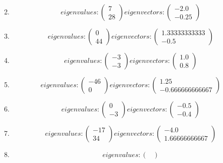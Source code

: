\documentclass{article}%
\begin{document}
\begin{enumerate}[label=\arabic*)]
\[\]%
\item%
\[%
eigenvalues: \begin{pmatrix}%
7\\%
28%
\end{pmatrix} eigenvectors: \begin{pmatrix}%
-2.0\\%
-0.25%
\end{pmatrix}%
\]%
\item%
\[%
eigenvalues: \begin{pmatrix}%
0\\%
44%
\end{pmatrix} eigenvectors: \begin{pmatrix}%
1.33333333333\\%
-0.5%
\end{pmatrix}%
\]%
\item%
\[%
eigenvalues: \begin{pmatrix}%
-3\\%
-3%
\end{pmatrix} eigenvectors: \begin{pmatrix}%
1.0\\%
0.8%
\end{pmatrix}%
\]%
\item%
\[%
eigenvalues: \begin{pmatrix}%
-46\\%
0%
\end{pmatrix} eigenvectors: \begin{pmatrix}%
1.25\\%
-0.666666666667%
\end{pmatrix}%
\]%
\item%
\[%
eigenvalues: \begin{pmatrix}%
0\\%
-3%
\end{pmatrix} eigenvectors: \begin{pmatrix}%
-0.5\\%
-0.4%
\end{pmatrix}%
\]%
\item%
\[%
eigenvalues: \begin{pmatrix}%
-17\\%
34%
\end{pmatrix} eigenvectors: \begin{pmatrix}%
-4.0\\%
1.66666666667%
\end{pmatrix}%
\]%
\item%
\[%
eigenvalues: \begin{pmatrix}%

\end{pmatrix}\]
\end{enumerate}
\end{document}
